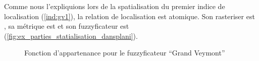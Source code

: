 Comme nous l’expliquions lors de la spatialisation du premier indice
de localisation (\ref{ind:gv1}), la relation de localisation
 est atomique. Son rasteriser est
, sa métrique est  et son
fuzzyficateur est 
(\autoref{fig:ex_parties_statialisation_dansplani}).

\begin{figure}
  \centering
  \hspace{1cm}
  \caption{Fonction d'appartenance pour le fuzzyficateur
    \protect{} \enquote{Grand Veymont}}
\end{figure}


